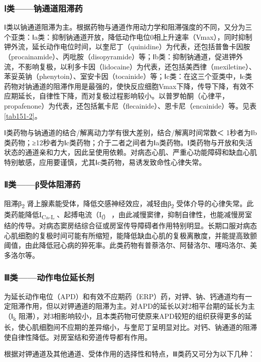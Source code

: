 \subsubsection{Ⅰ类------钠通道阻滞药}

Ⅰ类以钠通道阻滞为主。根据药物与通道作用动力学和阻滞强度的不同，又分为三个亚类：Ⅰa类：抑制钠通道开放，降低动作电位0相上升速率（Vmax），同时抑制钾外流，延长动作电位时间，以奎尼丁（quinidine）为代表，还包括普鲁卡因胺（procainamide）、丙吡胺（disopyramide）等；Ⅰb类：抑制钠通道，促进钾外流，不影响复极，以利多卡因（lidocaine）为代表，还包括美西律（mexiletine）、苯妥英钠（phenytoin）、室安卡因（tocainide）等；Ⅰc类：在这三个亚类中，Ⅰc类药物对钠通道的阻滞作用是最强的，使快反应细胞Vmax下降，传导下降，有效不应期延长，自律性下降，而对复极过程影响较小。以普罗帕酮（心律平，propafenone）为代表，还包括氟卡尼（flecainide）、恩卡尼（encainide）等。见表\ref{tab151-2}。

Ⅰ类药物与钠通道的结合/解离动力学有很大差别，结合/解离时间常数＜
1秒者为Ⅰb类药物；≥12秒者为Ⅰc类药物；介于二者之间者为Ⅰa类药物。Ⅰ类药物与开放和失活状态的通道亲和力大，因此呈使用依赖。对病态心肌、严重心功能障碍和缺血心肌特别敏感，应用要谨慎，尤其Ⅰc类药物，易诱发致命性心律失常。

\subsubsection{Ⅱ类------β受体阻滞药}

阻滞β\textsubscript{2}
肾上腺素能受体，降低交感神经效应，减轻由β\textsubscript{2}
受体介导的心律失常。此类药能降低I\textsubscript{Ca-L}
、起搏电流（I\textsubscript{f）}
，由此减慢窦律，抑制自律性，也能减慢房室结的传导。对病态窦房结综合征或房室传导障碍者作用特别明显。长期口服对病态心肌细胞的复极时间可能有所缩短，能降低缺血心肌的复极离散度，并能提高致颤阈值，由此降低冠心病的猝死率。此类药物有普萘洛尔、阿替洛尔、噻吗洛尔、美多洛尔等。

\subsubsection{Ⅲ类------动作电位延长剂}

为延长动作电位（APD）和有效不应期药（ERP）药，对钾、钠、钙通道均有一定阻滞作用，但以对钾通道的阻滞为主。对APD的延长以对2相平台期的延长为主（Ⅰ\textsubscript{k}
阻滞），对3相影响较小，且本类药物可使原来APD较短的组织获得更多的延长，使心肌细胞间不应期的差异缩小，与奎尼丁呈明显对比。对钙、钠通道的阻滞使自律性降低。对房室结和旁道传导都有作用。

根据对钾通道及其他通道、受体作用的选择性和特点，Ⅲ类药又可分为以下几种：

